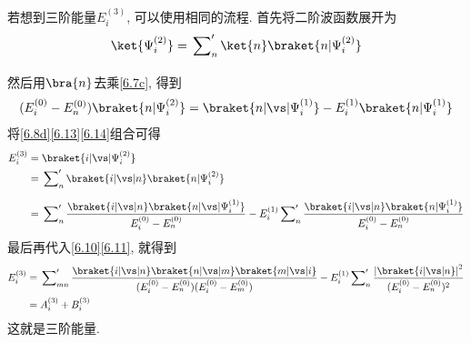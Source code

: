 若想到三阶能量$E_i^{(3)}$, 
可以使用相同的流程. 
首先将二阶波函数展开为
\begin{align}\label{6.13}
\ket{\Psi_i^{(2)}} = \sideset{}{'}{\sum_n}\ket{n}\braket{n|\Psi_i^{(2)}}
\end{align}
然后用$\bra{n}$去乘\autoref{6.7c}, 
得到
\begin{align}\label{6.14}
(E_i^{(0)} -E_n^{(0)} )\braket{n|\Psi_i^{(2)}} = \braket{n|\vs|\Psi_i^{(1)}} - E_i^{(1)}\braket{n|\Psi_i^{(1)}}
\end{align}
将\autoref{6.8d}\autoref{6.13}\autoref{6.14}组合可得
\begin{align*}
E_i^{(3)} & = \braket{i|\vs|\Psi_i^{(2)}}\\
		  & = \sideset{}{'}{\sum_n}\braket{i|\vs|n}\braket{n|\Psi_i^{(2)}}\\
		  & =\sideset{}{'}{\sum_n}\frac{\braket{i|\vs|n}\braket{n|\vs|\Psi_i^{(1)}}}{E_i^{(0)} - E_n^{(0)}} - E_i^{(1)} \sideset{}{'}{\sum_n}\frac{\braket{i|\vs|n}\braket{n|\Psi_i^{(1)}}}{E_i^{(0)} - E_n^{(0)} }
\end{align*}
最后再代入\autoref{6.10}\autoref{6.11}, 
就得到
\begin{align}
E_i^{(3)} & =\sideset{}{'}{\sum_{mn}}\frac{\braket{i|\vs|n}\braket{n|\vs|m}\braket{m|\vs|i} }{(E_i^{(0)} -E_n^{(0)})(E_i^{(0)} - E_m^{(0)} )  } - E_i^{(1)} \sideset{}{'}{\sum_n} \frac{\left| \braket{i|\vs|n} \right|^2}{(E_i^{(0)} -E_n^{(0)} )^2}\notag\\
& = A_i^{(3)} + B_i^{(3)}
\label{6.15}
\end{align}
这就是三阶能量.


